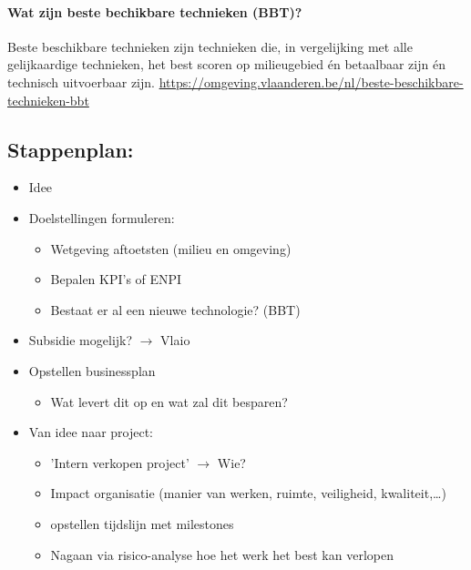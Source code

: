 \documentclass[12pt]{article}
\begin{document}
\paragraph{Wat zijn beste bechikbare technieken (BBT)?}
Beste beschikbare technieken zijn technieken die, in vergelijking met alle gelijkaardige technieken, het best scoren op milieugebied én betaalbaar zijn én technisch uitvoerbaar zijn.\newline
\url{https://omgeving.vlaanderen.be/nl/beste-beschikbare-technieken-bbt}
\subsection{Stappenplan:}
\begin{itemize}
    \item Idee 
    \item Doelstellingen formuleren:\begin{itemize}
        \item Wetgeving aftoetsten (milieu en omgeving)
        \item Bepalen KPI's of ENPI 
        \item Bestaat er al een nieuwe technologie? (BBT)
    \end{itemize}
    \item Subsidie mogelijk? $\rightarrow$ Vlaio 
    \item Opstellen businessplan\begin{itemize}
        \item Wat levert dit op en wat zal dit besparen?
    \end{itemize}
    \item Van idee naar project:\begin{itemize}
        \item 'Intern verkopen project' $\rightarrow$ Wie?
        \item Impact organisatie (manier van werken, ruimte, veiligheid, kwaliteit,\dots)
        \item opstellen tijdslijn met milestones 
        \item Nagaan via risico-analyse hoe het werk het best kan verlopen 
    \end{itemize}
\end{itemize}
\end{document}
